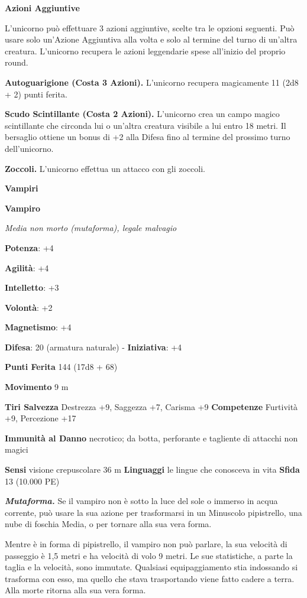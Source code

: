 \begin{multicols}{2}
\textbf{Azioni Aggiuntive}

L'unicorno può effettuare 3 azioni aggiuntive, scelte tra le opzioni
seguenti. Può usare solo un'Azione Aggiuntiva alla volta e solo al
termine del turno di un'altra creatura. L'unicorno recupera le azioni
leggendarie spese all'inizio del proprio round.

\textbf{Autoguarigione (Costa 3 Azioni).} L'unicorno recupera
magicamente 11 (2d8 + 2) punti ferita.

\textbf{Scudo Scintillante (Costa 2 Azioni).} L'unicorno crea un campo
magico scintillante che circonda lui o un'altra creatura visibile a lui
entro 18 metri. Il bersaglio ottiene un bonus di +2 alla Difesa fino al
termine del prossimo turno dell'unicorno.

\textbf{Zoccoli.} L'unicorno effettua un attacco con gli zoccoli.

\textbf{Vampiri}

\textbf{Vampiro}

\emph{Media non morto (mutaforma), legale malvagio}

\textbf{Potenza}: +4

\textbf{Agilità}: +4

\textbf{Intelletto}: +3

\textbf{Volontà}: +2

\textbf{Magnetismo}: +4

\textbf{Difesa}: 20 (armatura naturale) - \textbf{Iniziativa}: +4

\textbf{Punti Ferita} 144 (17d8 + 68)

\textbf{Movimento} 9 m

\textbf{Tiri Salvezza} Destrezza +9, Saggezza +7, Carisma +9
\textbf{Competenze} Furtività +9, Percezione +17

\textbf{Immunità al Danno} necrotico; da botta, perforante e
tagliente di attacchi non magici

\textbf{Sensi} visione crepuscolare 36 m
\textbf{Linguaggi} le lingue che conosceva in vita \textbf{Sfida} 13
(10.000 PE)\smallskip

\emph{\textbf{Mutaforma.}} Se il vampiro non è sotto la luce del sole o
immerso in acqua corrente, può usare la sua azione per trasformarsi in
un Minuscolo pipistrello, una nube di foschia Media, o per tornare alla
sua vera forma.

Mentre è in forma di pipistrello, il vampiro non può parlare, la sua
velocità di passeggio è 1,5 metri e ha velocità di volo 9 metri. Le sue
statistiche, a parte la taglia e la velocità, sono immutate. Qualsiasi
equipaggiamento stia indossando si trasforma con esso, ma quello che
stava trasportando viene fatto cadere a terra. Alla morte ritorna alla
sua vera forma.


\end{multicols}
